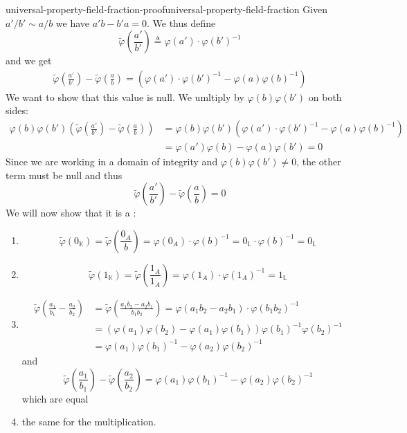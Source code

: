 \documentclass[preview]{standalone}
\begin{document}
\begin{snippetproof}{universal-property-field-fraction-proof}{universal-property-field-fraction}{}
    Given \(a'/b' \sim a/b\) we have \(a'b-b'a = 0\).
    We thus define
    \[
        \tilde{\varphi}\left(\frac{a'}{b'}\right) \triangleq \varphi(a') \cdot {\varphi(b')}^{-1}
    \]
    and we get
    \begin{align*}
        \tilde{\varphi}\left(\frac{a'}{b'}\right) - \tilde{\varphi}\left(\frac{a}{b}\right) 
        = \left(
            \varphi(a') \cdot {\varphi(b')}^{-1} - \varphi(a) {\varphi(b)}^{-1}
        \right)
    \end{align*}
    We want to show that this value is null. We umltiply by \(\varphi(b)\varphi(b')\) on both sides:
    \begin{align*}
        \varphi(b)\varphi(b') \left(
            \tilde{\varphi}\left(\frac{a'}{b'}\right) - \tilde{\varphi}\left(\frac{a}{b}\right)
        \right)
        &=
        \varphi(b)\varphi(b')
        \left(
            \varphi(a') \cdot {\varphi(b')}^{-1} - \varphi(a) {\varphi(b)}^{-1}
        \right) \\
        &= \varphi(a')\varphi(b) - \varphi(a)\varphi(b') = 0 
    \end{align*}
    Since we are working in a domain of integrity
    and \(\varphi(b)\varphi(b')\neq 0\), the other term must be null and thus
    \[ \tilde{\varphi}\left(\frac{a'}{b'}\right) - \tilde{\varphi}\left(\frac{a}{b}\right)  = 0 \]
    We will now show that it is a \ringhomomorphism:
    \begin{enumerate}
        \item \[
            \tilde{\varphi}(0_{\mathbb{K}})
            = \tilde{\varphi}(\frac{0_A}{b}) = \varphi(0_A) \cdot {\varphi(b)}^{-1} = 0_{\mathbb{L}} \cdot
            {\varphi(b)}^{-1} = 0_{\mathbb{L}}
        \]
        \item \[
            \tilde{\varphi}(1_{\mathbb{K}}) = \tilde{\varphi}\left(\frac{1_A}{1_A}\right)
            = \varphi(1_A) \cdot \varphi(1_A)^{-1} = 1_{\mathbb{L}}
        \]
        \item \begin{align*}
            \tilde{\varphi}\left(
                \frac{a_1}{b_1}- \frac{a_2}{b_2}
            \right)
            &= \tilde{\varphi}\left(
                \frac{a_1b_2 - a_2 b_1}{b_1b_2}
            \right)
            = \varphi(a_1b_2 - a_2b_1) \cdot {\varphi(b_1b_2)}^{-1}\\
            &= \left(\varphi(a_1) \varphi(b_2) - \varphi(a_1)\varphi(b_1)\right)
            {\varphi(b_1)}^{-1}{\varphi(b_2)}^{-1} \\
            &= \varphi(a_1){\varphi(b_1)}^{-1}
            - \varphi(a_2) {\varphi(b_2)}^{-1}
        \end{align*}
        and \[
            \tilde{\varphi}\left(\frac{a_1}{b_1}\right)
            - \tilde{\varphi}\left(\frac{a_2}{b_2}\right)
            = \varphi(a_1){\varphi(b_1)}^{-1}
            - \varphi(a_2) {\varphi(b_2)}^{-1}
        \]
        which are equal
        \item the same for the multiplication.
    \end{enumerate}
\end{snippetproof}
\end{document}
